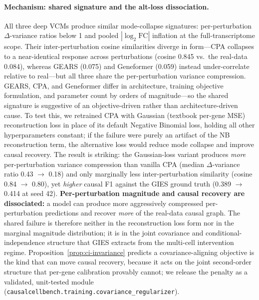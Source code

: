 \documentclass{article}
\theoremstyle{plain}
\theoremstyle{definition}
\theoremstyle{remark}
\begin{document}
\paragraph{Mechanism: shared signature and the alt-loss dissociation.} All three deep VCMs produce similar mode-collapse signatures: per-perturbation $\Delta$-variance ratios below 1 and pooled $|\log_2 \mathrm{FC}|$ inflation at the full-transcriptome scope. Their inter-perturbation cosine similarities diverge in form---CPA collapses to a near-identical response across perturbations (cosine 0.845 vs.\ the real-data 0.084), whereas GEARS (0.075) and Geneformer (0.059) instead under-correlate relative to real---but all three share the per-perturbation variance compression. GEARS, CPA, and Geneformer differ in architecture, training objective formulation, and parameter count by orders of magnitude---so the shared signature is suggestive of an objective-driven rather than architecture-driven cause. To test this, we retrained CPA with Gaussian (textbook per-gene MSE) reconstruction loss in place of its default Negative Binomial loss, holding all other hyperparameters constant; if the failure were purely an artifact of the NB reconstruction term, the alternative loss would reduce mode collapse and improve causal recovery. The result is striking: the Gaussian-loss variant produces \emph{more} per-perturbation variance compression than vanilla CPA (median $\Delta$-variance ratio 0.43 $\to$ 0.18) and only marginally less inter-perturbation similarity (cosine 0.84 $\to$ 0.80), yet \emph{higher} causal F1 against the GIES ground truth (0.389 $\to$ 0.414 at seed 42). \textbf{Per-perturbation magnitude and causal recovery are dissociated:} a model can produce more aggressively compressed per-perturbation predictions and recover \emph{more} of the real-data causal graph. The shared failure is therefore neither in the reconstruction loss form nor in the marginal magnitude distribution; it is in the joint covariance and conditional-independence structure that GIES extracts from the multi-cell intervention regime. Proposition~\ref{prop:ci-invariance} predicts a covariance-aligning objective is the kind that can move causal recovery, because it acts on the joint second-order structure that per-gene calibration provably cannot; we release the penalty as a validated, unit-tested module (\texttt{causalcellbench.training.covariance\_regularizer}).
\end{document}
